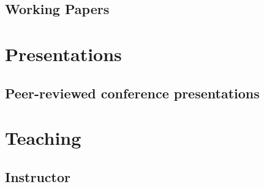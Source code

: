 \documentclass[11pt]{article}
\begin{document}

\begin{refsection}
\section*{Working Papers}
\nocite{*}
\printbibliography[heading = none, keyword = working, env = mybib]
\end{refsection}



\section*{Presentations}
\subsection*{Peer-reviewed conference presentations}
\begin{refsection}
\nocite{*}
\printbibliography[heading = none,
keyword = conference,               %
keyword = peer,                     %
env = mybib,
check = recent]                     %
\end{refsection}                    %




\section*{Teaching}

\subsection*{Instructor}
\end{document}
